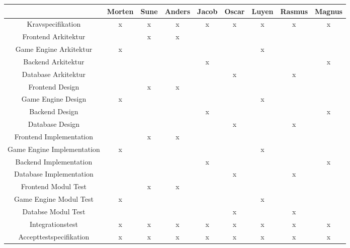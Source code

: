 \begin{center}
  \begin{longtable}{|c|c|c|c|c|c|c|c|c|}
    \hline
                                & Morten & Sune & Anders & Jacob & Oscar & Luyen & Rasmus & Magnus \\ \hline
    Kravspecifikation           & x      & x    & x      & x     & x     & x     & x      & x      \\ \hline
    Frontend Arkitektur         &        & x    & x      &       &       &       &        &        \\ \hline
    Game Engine Arkitektur      & x      &      &        &       &       & x     &        &        \\ \hline
    Backend Arkitektur          &        &      &        & x     &       &       &        & x      \\ \hline
    Database Arkitektur         &        &      &        &       & x     &       & x      &        \\ \hline
    Frontend Design             &        & x    & x      &       &       &       &        &        \\ \hline
    Game Engine Design          & x      &      &        &       &       & x     &        &        \\ \hline
    Backend Design              &        &      &        & x     &       &       &        & x      \\ \hline
    Database Design             &        &      &        &       & x     &       & x      &        \\ \hline
    Frontend Implementation     &        & x    & x      &       &       &       &        &        \\ \hline
    Game Engine Implementation  & x      &      &        &       &       & x     &        &        \\ \hline
    Backend Implementation      &        &      &        & x     &       &       &        & x      \\ \hline
    Database Implementation     &        &      &        &       & x     &       & x      &        \\ \hline
    Frontend Modul Test         &        & x    & x      &       &       &       &        &        \\ \hline
    Game Engine Modul Test      & x      &      &        &       &       & x     &        &        \\ \hline
    Databse Modul Test          &        &      &        &       & x     &       & x      &        \\ \hline
    Integrationstest            & x      & x    & x      & x     & x     & x     & x      & x      \\ \hline
    Accepttestspecifikation     & x      & x    & x      & x     & x     & x     & x      & x      \\ \hline
  \end{longtable}
  \addtocounter{table}{-1}
\end{center}

\newpage
